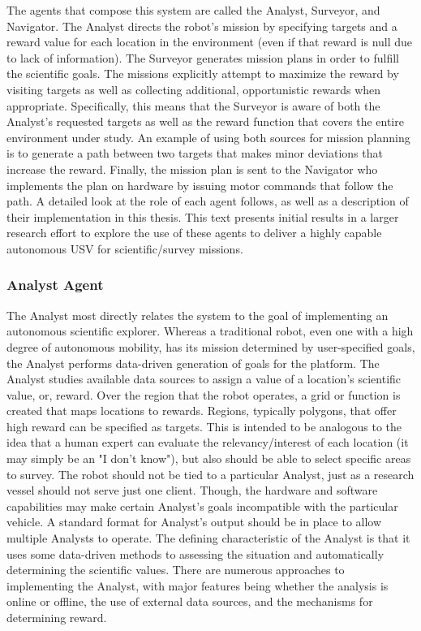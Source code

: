 \documentclass{tamuccthesis}
\begin{document}
The agents that compose this system are called the Analyst, Surveyor, and Navigator. The Analyst directs the robot's mission by specifying targets and a reward value for each location in the environment (even if that reward is null due to lack of information). The Surveyor generates mission plans in order to fulfill the scientific goals. The missions explicitly attempt to maximize the reward by visiting targets as well as collecting additional, opportunistic rewards when appropriate. Specifically, this means that the Surveyor is aware of both the Analyst's requested targets as well as the reward function that covers the entire environment under study. An example of using both sources for mission planning is to generate a path between two targets that makes minor deviations that increase the reward. Finally, the mission plan is sent to the Navigator who implements the plan on hardware by issuing motor commands that follow the path. A detailed look at the role of each agent follows, as well as a description of their implementation in this thesis. This text presents initial results in a larger research effort to explore the use of these agents to deliver a highly capable autonomous USV for scientific/survey missions. 

\subsubsection{Analyst Agent}

The Analyst most directly relates the system to the goal of implementing an autonomous scientific explorer. Whereas a traditional robot, even one with a high degree of autonomous mobility, has its mission determined by user-specified goals, the Analyst performs data-driven generation of goals for the platform. The Analyst studies available data sources to assign a value of a location's scientific value, or, reward. Over the region that the robot operates, a grid or function is created that maps locations to rewards. Regions, typically polygons, that offer high reward can be specified as targets. This is intended to be analogous to the idea that a human expert can evaluate the relevancy/interest of each location (it may simply be an "I don't know"), but also should be able to select specific areas to survey. The robot should not be tied to a particular Analyst, just as a research vessel should not serve just one client. Though, the hardware and software capabilities may make certain Analyst's goals incompatible with the particular vehicle. A standard format for Analyst's output should be in place to allow multiple Analysts to operate. The defining characteristic of the Analyst is that it uses some data-driven methods to assessing the situation and automatically determining the scientific values. There are numerous approaches to implementing the Analyst, with major features being whether the analysis is online or offline, the use of external data sources, and the mechanisms for determining reward. 
\end{document}
